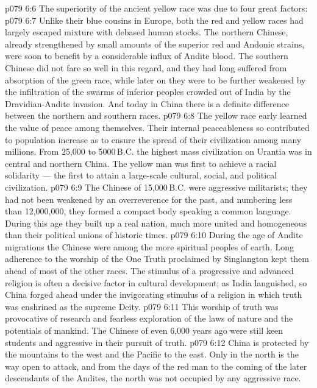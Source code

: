 \vs p079 6:6 The superiority of the ancient yellow race was due to four great factors:
\vs p079 6:7 \bibnobreakspace {} Unlike their blue cousins in Europe, both the red and yellow races had largely escaped mixture with debased human stocks. The northern Chinese, already strengthened by small amounts of the superior red and Andonic strains, were soon to benefit by a considerable influx of Andite blood. The southern Chinese did not fare so well in this regard, and they had long suffered from absorption of the green race, while later on they were to be further weakened by the infiltration of the swarms of inferior peoples crowded out of India by the Dravidian\hyp{}Andite invasion. And today in China there is a definite difference between the northern and southern races.
\vs p079 6:8 \bibnobreakspace {} The yellow race early learned the value of peace among themselves. Their internal peaceableness so contributed to population increase as to ensure the spread of their civilization among many millions. From 25,000 to 5000\,B.C. the highest mass civilization on Urantia was in central and northern China. The yellow man was first to achieve a racial solidarity --- the first to attain a large\hyp{}scale cultural, social, and political civilization.
\vs p079 6:9 The Chinese of 15,000\,B.C. were aggressive militarists; they had not been weakened by an overreverence for the past, and numbering less than 12,000,000, they formed a compact body speaking a common language. During this age they built up a real nation, much more united and homogeneous than their political unions of historic times.
\vs p079 6:10 \bibnobreakspace {} During the age of Andite migrations the Chinese were among the more spiritual peoples of earth. Long adherence to the worship of the One Truth proclaimed by Singlangton kept them ahead of most of the other races. The stimulus of a progressive and advanced religion is often a decisive factor in cultural development; as India languished, so China forged ahead under the invigorating stimulus of a religion in which truth was enshrined as the supreme Deity.
\vs p079 6:11 This worship of truth was provocative of research and fearless exploration of the laws of nature and the potentials of mankind. The Chinese of even 6,000 years ago were still keen students and aggressive in their pursuit of truth.
\vs p079 6:12 \bibnobreakspace {} China is protected by the mountains to the west and the Pacific to the east. Only in the north is the way open to attack, and from the days of the red man to the coming of the later descendants of the Andites, the north was not occupied by any aggressive race.
